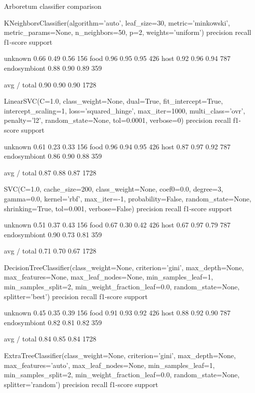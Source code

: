 





Arboretum classifier comparison


KNeighborsClassifier(algorithm='auto', leaf_size=30, metric='minkowski',
metric_params=None, n_neighbors=50, p=2, weights='uniform')
precision    recall  f1-score   support

unknown       0.66      0.49      0.56       156
food       0.96      0.95      0.95       426
host       0.92      0.96      0.94       787
endosymbiont       0.88      0.90      0.89       359

avg / total       0.90      0.90      0.90      1728

LinearSVC(C=1.0, class_weight=None, dual=True, fit_intercept=True,
intercept_scaling=1, loss='squared_hinge', max_iter=1000,
multi_class='ovr', penalty='l2', random_state=None, tol=0.0001,
verbose=0)
precision    recall  f1-score   support

unknown       0.61      0.23      0.33       156
food       0.96      0.94      0.95       426
host       0.87      0.97      0.92       787
endosymbiont       0.86      0.90      0.88       359

avg / total       0.87      0.88      0.87      1728

SVC(C=1.0, cache_size=200, class_weight=None, coef0=0.0, degree=3, gamma=0.0,
kernel='rbf', max_iter=-1, probability=False, random_state=None,
shrinking=True, tol=0.001, verbose=False)
precision    recall  f1-score   support

unknown       0.51      0.37      0.43       156
food       0.67      0.30      0.42       426
host       0.67      0.97      0.79       787
endosymbiont       0.90      0.73      0.81       359

avg / total       0.71      0.70      0.67      1728

DecisionTreeClassifier(class_weight=None, criterion='gini', max_depth=None,
max_features=None, max_leaf_nodes=None, min_samples_leaf=1,
min_samples_split=2, min_weight_fraction_leaf=0.0,
random_state=None, splitter='best')
precision    recall  f1-score   support

unknown       0.45      0.35      0.39       156
food       0.91      0.93      0.92       426
host       0.88      0.92      0.90       787
endosymbiont       0.82      0.81      0.82       359

avg / total       0.84      0.85      0.84      1728

ExtraTreeClassifier(class_weight=None, criterion='gini', max_depth=None,
max_features='auto', max_leaf_nodes=None, min_samples_leaf=1,
min_samples_split=2, min_weight_fraction_leaf=0.0,
random_state=None, splitter='random')
precision    recall  f1-score   support

